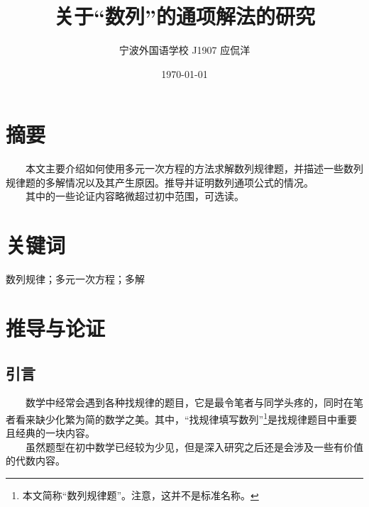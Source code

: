 \documentclass[12pt]{article}
\title{关于“数列”的通项解法的研究}
\author{宁波外国语学校 J1907 应侃洋}
\date{\today}
\begin{document}
  \maketitle
  \newpage
  \tableofcontents
  \newpage
    \section{摘要}
      　　本文主要介绍如何使用多元一次方程的方法求解数列规律题，并描述一些数列规律题的多解情况以及其产生原因。推导并证明数列通项公式的情况。\\
      　　其中的一些论证内容略微超过初中范围，可选读。
    \section{关键词}
      数列规律；多元一次方程；多解
    \section{推导与论证}
      \subsection{引言}
        　　数学中经常会遇到各种找规律的题目，它是最令笔者与同学头疼的，同时在笔者看来缺少化繁为简的数学之美。其中，“找规律填写数列”\footnote{本文简称“数列规律题”。注意，这并不是标准名称。}是找规律题目中重要且经典的一块内容。\\
        　　虽然题型在初中数学已经较为少见，但是深入研究之后还是会涉及一些有价值的代数内容。\\
\end{document}
